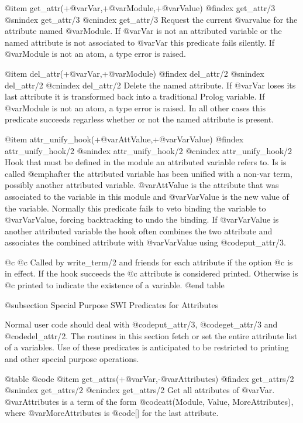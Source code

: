 @item get_attr(+@var{Var},+@var{Module},+@var{Value})
@findex get_attr/3
@snindex get_attr/3
@cnindex get_attr/3
Request the current @var{value} for the attribute named @var{Module}.  If
@var{Var} is not an attributed variable or the named attribute is not
associated to @var{Var} this predicate fails silently.  If @var{Module}
is not an atom, a type error is raised.

@item del_attr(+@var{Var},+@var{Module})
@findex del_attr/2
@snindex del_attr/2
@cnindex del_attr/2
Delete the named attribute.  If @var{Var} loses its last attribute it
is transformed back into a traditional Prolog variable.  If @var{Module}
is not an atom, a type error is raised. In all other cases this
predicate succeeds regarless whether or not the named attribute is
present.

@item attr_unify_hook(+@var{AttValue},+@var{VarValue})
@findex attr_unify_hook/2
@snindex attr_unify_hook/2
@cnindex attr_unify_hook/2
Hook that must be defined in the module an attributed variable refers
to. Is is called @emph{after} the attributed variable has been
unified with a non-var term, possibly another attributed variable.
@var{AttValue} is the attribute that was associated to the variable
in this module and @var{VarValue} is the new value of the variable.
Normally this predicate fails to veto binding the variable to
@var{VarValue}, forcing backtracking to undo the binding.  If
@var{VarValue} is another attributed variable the hook often combines
the two attribute and associates the combined attribute with 
@var{VarValue} using @code{put_attr/3}.

@c     
@c Called by write_term/2 and friends for each attribute if the option
@c  is in effect.  If the hook succeeds the
@c attribute is considered printed.  Otherwise  is
@c printed to indicate the existence of a variable.
@end table

@subsection Special Purpose SWI Predicates for Attributes

Normal user code should deal with @code{put_attr/3}, @code{get_attr/3}
and @code{del_attr/2}.  The routines in this section fetch or set the
entire attribute list of a variables. Use of these predicates is
anticipated to be restricted to printing and other special purpose
operations.

@table @code
@item get_attrs(+@var{Var},-@var{Attributes})
@findex get_attrs/2
@snindex get_attrs/2
@cnindex get_attrs/2
Get all attributes of @var{Var}. @var{Attributes} is a term of the form
@code{att(Module, Value, MoreAttributes)}, where @var{MoreAttributes} is
@code{[]} for the last attribute.

